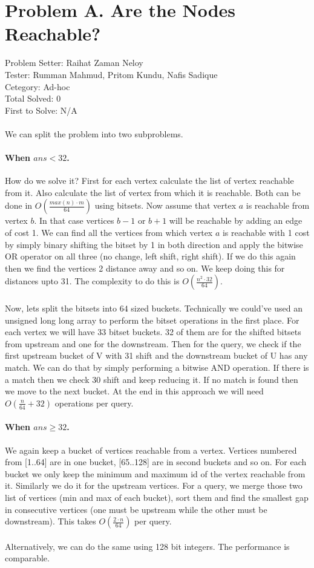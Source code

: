 \section*{Problem A. Are the Nodes Reachable?}
Problem Setter: Raihat Zaman Neloy\\
Tester: Rumman Mahmud, Pritom Kundu, Nafis Sadique\\
Cetegory: Ad-hoc\\
Total Solved: 0 \\
First to Solve: N/A \\
\\
We can split the problem into two subproblems.
\paragraph*{When $ans < 32$.}
How do we solve it? First for each vertex calculate the list of vertex reachable from it. Also
calculate the list of vertex from which it is reachable. Both can be done in $O(\frac{max(n) \cdot m}{64})$ using bitsets.
Now assume that vertex $a$ is reachable from vertex $b$. In that case vertices $b-1$ or $b+1$ will be reachable by 
adding an edge of cost 1. We can find all the vertices from which vertex $a$ is reachable with 1 cost by simply
binary shifting the bitset by 1 in both direction and apply the bitwise OR operator on all three (no change, left shift, right shift).
If we do this again then we find the vertices 2 distance away and so on. We keep doing this for distances upto 31. The
complexity to do this is $O(\frac{n^2 \cdot 32}{64})$. 
\\
\\
Now, lets split the bitsets into $64$ sized buckets. Technically we could've used an unsigned long long array to perform
the bitset operations in the first place. For each vertex we will have 33 bitset buckets. 32 of them are for
the shifted bitsets from upstream and one for the downstream.
Then for the query, we check if the first upstream bucket of V with 31 shift and the downstream bucket of U has any match. We 
can do that by simply performing a bitwise AND operation. If there is a match then we check 30 shift and keep reducing it. If 
no match is found then we move to the next bucket. At the end in this approach we will need $O(\frac{n}{64}+32)$ operations
per query.
\paragraph*{When $ans \ge 32$.}
We again keep a bucket of vertices reachable from a vertex. Vertices numbered from [1..64] are in one bucket, [65..128] are 
in second buckets and so on. For each bucket we only keep the minimum and maximum id of the vertex reachable from it. Similarly we do it 
for the upstream vertices. For a query, we merge those two list of vertices (min and max of each bucket), sort them and find the
smallest gap in consecutive vertices (one must be upstream while the other must be downstream). This takes $O(\frac{2 \cdot n}{64})$ per
query.
\\ 
\\
Alternatively, we can do the same using 128 bit integers. The performance is comparable.
